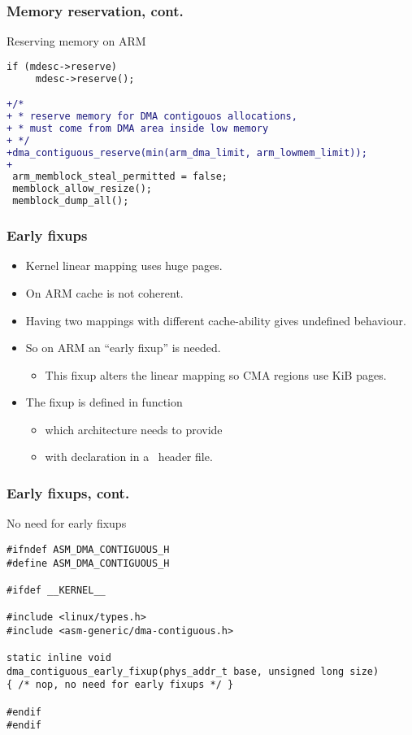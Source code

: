 \begin{frame}[fragile]
  \frametitle{Memory reservation, cont.}

  \begin{block}{Reserving memory on ARM}
\begin{lstlisting}[language=diff]
 if (mdesc->reserve)
     mdesc->reserve();

+/*
+ * reserve memory for DMA contigouos allocations,
+ * must come from DMA area inside low memory
+ */
+dma_contiguous_reserve(min(arm_dma_limit, arm_lowmem_limit));
+
 arm_memblock_steal_permitted = false;
 memblock_allow_resize();
 memblock_dump_all();
\end{lstlisting}
  \end{block}
\end{frame}

\begin{frame}
  \frametitle{Early fixups}

  \begin{itemize}
  \item Kernel linear mapping uses huge pages.
  \item On ARM cache is not coherent.
  \item Having two mappings with different cache-ability gives
    undefined behaviour.
  \item So on ARM an “early fixup” is needed.
    \begin{itemize}
    \item This fixup alters the linear mapping so CMA regions use
      \unit[4]{KiB} pages.
    \end{itemize}
  \item The fixup is defined in
     function
    \begin{itemize}
    \item which architecture needs to provide
    \item with declaration in a~ header file.
    \end{itemize}
  \end{itemize}
\end{frame}

\begin{frame}[fragile]
  \frametitle{Early fixups, cont.}

  \begin{block}{No need for early fixups}
\begin{lstlisting}
#ifndef ASM_DMA_CONTIGUOUS_H
#define ASM_DMA_CONTIGUOUS_H

#ifdef __KERNEL__

#include <linux/types.h>
#include <asm-generic/dma-contiguous.h>

static inline void
dma_contiguous_early_fixup(phys_addr_t base, unsigned long size)
{ /* nop, no need for early fixups */ }

#endif
#endif
\end{lstlisting}
  \end{block}
\end{frame}

